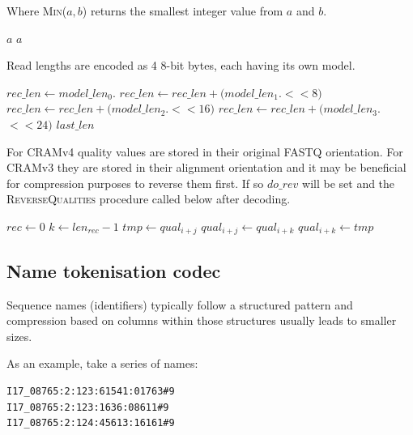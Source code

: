 \documentclass[a4paper]{article}
\begin{document}
Where \textsc{Min}($a,b$) returns the smallest integer value from $a$ and $b$.

\begin{algorithmic}[1]
    \State \Return $a$
  \Else
    \State \Return $a$
  \EndIf
  \EndFunction
\end{algorithmic}

Read lengths are encoded as 4 8-bit bytes, each having its own model.

\begin{algorithmic}[1]
\State $rec\_len \gets model\_len_0.$
\State $rec\_len \gets rec\_len + (model\_len_1.$$ << 8)$
\State $rec\_len \gets rec\_len + (model\_len_2.$$ << 16)$
\State $rec\_len \gets rec\_len + (model\_len_3.$$ << 24)$
\State \Return $last\_len$
\EndFunction
\end{algorithmic}

For CRAMv4 quality values are stored in their original FASTQ
orientation.  For CRAMv3 they are stored in their alignment
orientation and it may be beneficial for compression purposes to
reverse them first.  If so $do\_rev$ will be set and the
\textsc{ReverseQualities} procedure called below after decoding.

\begin{algorithmic}[1]
\State $rec \gets 0$
    \State $k \gets len_{rec}-1$
      \State $tmp \gets qual_{i+j}$
      \State $qual_{i+j} \gets qual_{i+k}$
      \State $qual_{i+k} \gets tmp$
    \EndFor
  \EndIf
\EndFor
\EndProcedure
\end{algorithmic}


\subsection*{Name tokenisation codec}

Sequence names (identifiers) typically follow a structured pattern and
compression based on columns within those structures usually leads to
smaller sizes.

As an example, take a series of names:

\begin{verbatim}
I17_08765:2:123:61541:01763#9
I17_08765:2:123:1636:08611#9
I17_08765:2:124:45613:16161#9
\end{verbatim}
\end{document}
